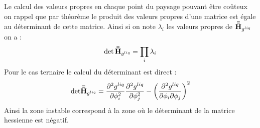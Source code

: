 Le calcul des valeurs propres en chaque point du paysage pouvant être coûteux on rappel que par théorème le produit des valeurs propres d'une matrice est égale au déterminant de cette matrice. Ainsi si on note $\lambda_i$ les valeurs propres de $\mathbf{\bar{\bar{H}}}_{g^{liq}}$ on a :
\begin{equation}
	\det{\mathbf{\bar{\bar{H}}}_{g^{liq}}} = \prod_i \lambda_i
\end{equation}
Pour le cas ternaire le calcul du déterminant est direct :
\begin{equation}
	\text{det}  \mathbf{\bar{\bar{H}}}_{g^{liq}}   =  \frac{\partial^2 g^{liq}}{\partial \phi_i^2}
	\frac{\partial^2 g^{liq}}{\partial \phi_j^2}-\left(\frac{\partial^2 g^{liq} }{\partial \phi_i \partial \phi_j} \right)^2
\end{equation}
Ainsi la zone instable correspond à la zone où le déterminant de la matrice hessienne est négatif.

